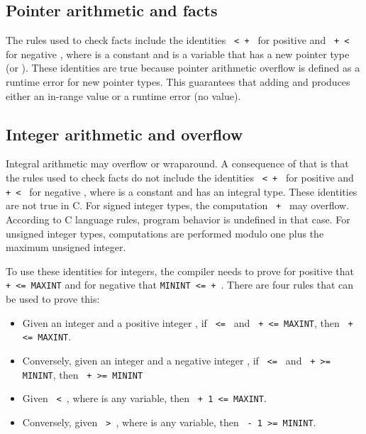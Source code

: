 \subsection{Pointer arithmetic and facts}

The rules used to check facts include the identities \texttt{ <  + }
for positive  and \texttt{ +  < } for
negative , where  is a
constant and  is a variable that has a new pointer type (\ptr or \arrayptr).
These identities are true
because pointer arithmetic overflow is defined as a runtime error for
new pointer types. This guarantees that adding  and  produces either
an in-range value or a runtime error (no value).

\subsection{Integer arithmetic and overflow}
\label{section:where-clauses-and-overflow}

Integral arithmetic may overflow or wraparound. A consequence of that is
that the rules used to check facts do not include the identities 
\texttt{ <  + } 
for positive  and \texttt{ +  < } for 
negative , where  is a
constant and  has an integral type. These identities are not true in C.  For signed integer types, the computation \texttt{ + }
may overflow.   According to C language
rules, program behavior is undefined in that case.  For unsigned
integer types, computations are performed modulo one plus
the maximum unsigned integer.

To use these identities for integers, the compiler needs to prove for
positive  that \texttt{ +  <= MAXINT} and for negative  that \texttt{MININT <=  + }.  There are four rules that can be used to prove this:

\begin{itemize}
\item
  Given an integer  and a positive integer , if 
  \texttt{ <= } and \texttt{ +  <= MAXINT},
  then \texttt{ +  <= MAXINT}.
\item
  Conversely, given an integer  and a negative integer 
  , if \texttt{ <= } and \texttt{ +
    >= MININT}, then \texttt{ +  >= MININT}
\item
  Given \texttt{ < }, where  is any variable, 
  then \texttt{ + 1 <= MAXINT}.
\item
  Conversely, given \texttt{ > }, where 
  is any variable, then \texttt{ - 1 >= MININT}.
\end{itemize}

